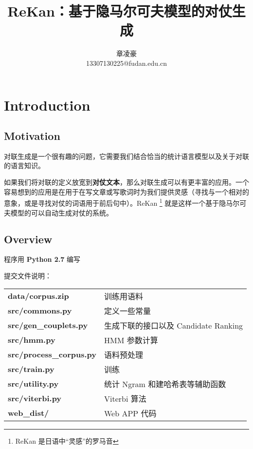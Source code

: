 \documentclass[12pt]{article}
\title{ReKan：基于隐马尔可夫模型的对仗生成}
\author{章凌豪\\13307130225@fudan.edu.cn}
\date{}
\begin{document}

\null  %
\nointerlineskip  %
\vfill
\let\snewpage \newpage
\let\newpage \relax
\maketitle
\let \newpage \snewpage
\vfill 
\break %

\newpage


\pagestyle{fancy}
\lhead{\textbf{{\thetitle}}}
\rhead{\textbf{\nouppercase{\firstleftmark}}}
\cfoot{\thepage}

\section{Introduction}

\subsection{Motivation}

对联生成是一个很有趣的问题，它需要我们结合恰当的统计语言模型以及关于对联的语言知识。

如果我们将对联的定义放宽到\textbf{对仗文本}，那么对联生成可以有更丰富的应用。一个容易想到的应用是在用于在写文章或写歌词时为我们提供灵感（寻找与一个相对的意象，或是寻找对仗的词语用于前后句中）。ReKan \footnote{ReKan 是日语中“灵感”的罗马音} 就是这样一个基于隐马尔可夫模型的可以自动生成对仗的系统。

\subsection{Overview}

程序用 \textbf{Python 2.7} 编写

提交文件说明：

\begin{table}[ht!]
\centering
\begin{tabular}{ll}
{\bf data/corpus.zip}           & 训练用语料                                 \\
{\bf src/commons.py}            & 定义一些常量                               \\
{\bf src/gen\_couplets.py}      & 生成下联的接口以及 Candidate Ranking       \\
{\bf src/hmm.py}                & HMM 参数计算                               \\
{\bf src/process\_corpus.py}    & 语料预处理                                 \\
{\bf src/train.py}              & 训练                                       \\
{\bf src/utility.py}            & 统计 Ngram 和建哈希表等辅助函数            \\
{\bf src/viterbi.py}            & Viterbi 算法                               \\
{\bf web\_dist/}                & Web APP 代码                               \\                                         
\end{tabular}
\end{table}
\end{document}
